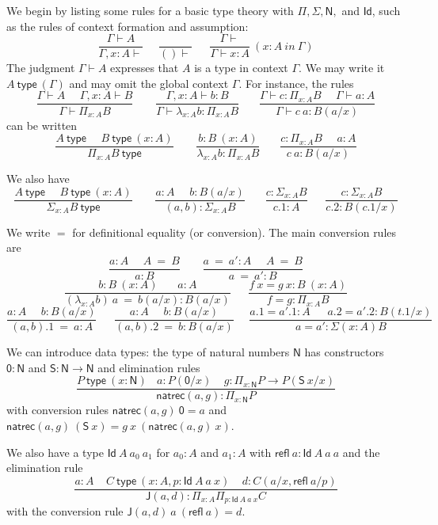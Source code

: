 \documentclass[11pt,a4paper]{article}
\newcommand{\refl}{\mathsf{refl}}
\newcommand{\Id}{\mathsf{Id}}
\newcommand{\conv}{=}
\def\NN{\mathsf{N}}
\def\JJ{\mathsf{J}}
\def\ZERO{\mathsf{0}}
\def\SUCC{\mathsf{S}}
\newcommand{\type}{\mathsf{type}}
\newcommand{\mypi}[3]{\Pi_{#1:#2}#3}
\newcommand{\mylam}[3]{\lambda_{#1:#2}#3}
\newcommand{\mysig}[3]{\Sigma_{#1:#2}#3}
\newcommand{\N}{\mathsf{N}}
\newcommand{\natrec}{\mathsf{natrec}}
\begin{document}
We begin by listing some rules for a basic type theory with $\Pi, \Sigma, \N,$ and $\Id$, such as the rules of context formation and assumption:
$$
\frac{\Gamma\vdash A}{\Gamma,x:A\vdash}~~~~~~\frac{}{()\vdash}~~~~~~~
\frac{\Gamma\vdash}{\Gamma\vdash x:A}~(x\!:\! A~in~\Gamma)
$$
The judgment $\Gamma\vdash A$ expresses that $A$ is a type in context $\Gamma$.
We may write it $A~\type~(\Gamma)$ and may omit the global context $\Gamma$.
For instance, the rules
$$
\frac{\Gamma\vdash A~~~~~~\Gamma,x:A\vdash B}{\Gamma\vdash \mypi{x}{A}{B}}~~~~~~~~~
\frac{\Gamma,x:A\vdash b:B}{\Gamma\vdash \mylam{x}{A}{b}:\mypi{x}{A}{B}}~~~~~~~~
\frac{\Gamma\vdash c:\mypi{x}{A}{B}~~~~~~\Gamma\vdash a:A}
     {\Gamma\vdash c~a:B(a/x)}
$$
can be written
$$
\frac{A~\type~~~~~~B~\type~(x:A)}{\mypi{x}{A}{B}~\type}~~~~~~~~~
\frac{b:B~(x:A)}{\mylam{x}{A}{b}:\mypi{x}{A}{B}}~~~~~~~~
\frac{c:\mypi{x}{A}{B}~~~~~~a:A}
     {c~a:B(a/x)}
$$

We also have
$$
\frac{A~\type~~~~~~B~\type~(x:A)}{\mysig{x}{A}{B}~\type}~~~~~~~~~
\frac{a:A~~~~~~b:B(a/x)}{(a,b):\mysig{x}{A}{B}}~~~~~~~~
\frac{c:\mysig{x}{A}{B}}{c.1:A}~~~~~~~
\frac{c:\mysig{x}{A}{B}}{c.2:B(c.1/x)}
$$

We write $\conv$ for definitional equality (or conversion). The main conversion rules are
$$
\frac{ a:A~~~~~~ A~ \conv~ B}{ a:B}~~~~~~~~~
\frac{ a ~\conv~a':A~~~~~~ A  ~\conv~ B}{ a ~\conv~a':B}
$$
$$
\frac{b:B~(x:A)~~~~~~~~ a:A}{ (\mylam {x}{A}{b})~a  ~\conv~ b(a/x):B(a/x)}
~~~~~~~
\frac{f~x = g~x:B~(x:A)}{ f = g : \mypi{x}{A}{B}}
$$
$$
\frac{ a:A~~~~~~ b:B(a/x)}{ (a,b).1  ~\conv~ a:A}
~~~~~~~
\frac{ a:A~~~~~~ b:B(a/x)}{ (a,b).2  ~\conv~ b:B(a/x)}~~~~~~
\frac{ a.1 = a'.1:A~~~~~~~ a.2 = a'.2:B(t.1/x)}{ a = a' : \Sigma (x:A)B}
$$

We can introduce data types: the type of natural numbers $\NN$ has
constructors $\ZERO:\NN$ and $\SUCC:\NN\rightarrow\NN$ and elimination rules
$$
\frac{P~\type~(x:\NN)~~~~a:P(\ZERO/x)~~~~~g:\mypi{x}{\NN}{P\rightarrow P(\SUCC~x/x)}}{\natrec(a,g):\mypi{x}{\NN}{P}}
$$
with conversion rules $\natrec(a,g)~\ZERO = a$ and $\natrec(a,g)~(\SUCC~x) = g~x~(\natrec(a,g)~x)$.

We also have a type $\Id~A~a_0~a_1$ for $a_0:A$ and $a_1:A$ with $\refl~a:\Id~A~a~a$
and the elimination rule
$$\frac{a:A~~~~~C~\type~(x:A,p:\Id~A~a~x)~~~~~d:C(a/x,\refl~a/p)}{\JJ (a,d):\mypi{x}{A}{\mypi{p}{\Id~A~a~x}{C}}}$$
with the conversion rule $\JJ(a,d)~a~(\refl~a) = d$.
\end{document}
